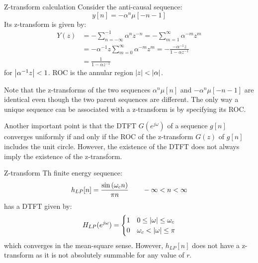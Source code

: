\documentclass[../../main/main.tex]{subfiles}
\begin{document}
\begin{example}{Z-transform calculation}{}
    Consider the anti-causal sequence:
    \begin{equation}
        y[n]
        =
        - \alpha^{n} \mu[-n-1]
        \label{eq:L14_S12_1}
    \end{equation}
    Its z-transform is given by:
    \begin{align}
        Y(z)
        &=
            - \sum_{n=-\infty}^{-1} \alpha^{n} z^{-n}
            =
            - \sum_{m=1}^{\infty} \alpha^{-m} z^{m} \nonumber   \\
        &=
            - \alpha^{-1} z \sum_{m=0}^{\infty} \alpha^{-m} z^{m}
            =
            - \frac{- \alpha^{-1} z}{1 - \alpha z^{-1}} \nonumber   \\
        &=
            \frac{1}{1 - \alpha z^{-1}}
    \end{align}
    for \( \abs{\alpha^{-1}z} < 1 \). ROC is the annular region \( \abs{z} < \abs{\alpha} \).
\end{example}

Note that the z-transforms of the two sequences \( \alpha^{n} \mu[n] \) and \( - \alpha^{n} \mu[-n-1] \) are identical even though the two parent sequences are different. The only way a unique sequence can be associated with a z-transform is by specifying its ROC.

Another important point is that the DTFT \( G(e^{j\omega}) \) of a sequence \( g[n] \) converges uniformly if and only if the ROC of the z-transform \( G(z) \) of \( g[n] \) includes the unit circle. However, the existence of the DTFT does not always imply the existence of the z-transform.

\begin{example}{Z-transform}{}
    Th finite energy sequence:
    \begin{equation}
        h_{LP}[n]
        =
        \frac{\sin\qty(\omega_{c}n)}{\pi n}
        \qquad
        - \infty < n < \infty
        \label{eq:L14_S15_1}
    \end{equation}
    has a DTFT given by:
    \begin{equation}
        H_{LP}(e^{j\omega})
        =
        \begin{cases}
            1   &   0 \le \abs{\omega} \le \omega_{c}   \\
            0   &   \omega_{c} < \abs{\omega} \le \pi
        \end{cases}
        \label{eq:L14_S15_2}
    \end{equation}
    which converges in the mean-square sense. However, \( h_{LP}[n] \) does not have a z-transform as it is not absolutely summable for any value of \( r \).
\end{example}
\end{document}
